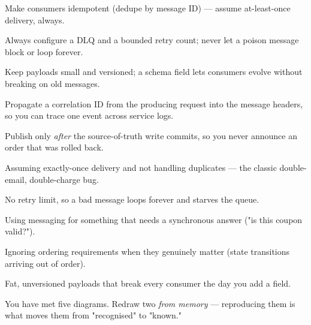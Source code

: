 \begin{bestpractices}
\begin{wbitem}
  \item Make consumers idempotent (dedupe by message ID) --- assume at-least-once delivery, always.
  \item Always configure a DLQ and a bounded retry count; never let a poison message block or loop forever.
  \item Keep payloads small and versioned; a schema field lets consumers evolve without breaking on old messages.
  \item Propagate a correlation ID from the producing request into the message headers, so you can trace one event across service logs.
  \item Publish only \emph{after} the source-of-truth write commits, so you never announce an order that was rolled back.
\end{wbitem}
\end{bestpractices}
\begin{mistakes}
\begin{wbitem}
  \item Assuming exactly-once delivery and not handling duplicates --- the classic double-email, double-charge bug.
  \item No retry limit, so a bad message loops forever and starves the queue.
  \item Using messaging for something that needs a synchronous answer ("is this coupon valid?").
  \item Ignoring ordering requirements when they genuinely matter (state transitions arriving out of order).
  \item Fat, unversioned payloads that break every consumer the day you add a field.
\end{wbitem}
\end{mistakes}


You have met five diagrams. Redraw two \emph{from memory} --- reproducing them is what moves them from "recognised" to "known."

\begin{writespace}
\end{writespace}

\begin{writespace}
\end{writespace}

